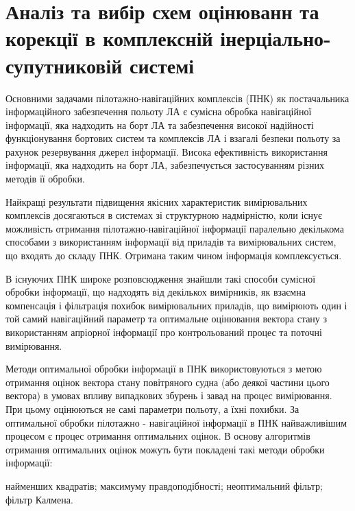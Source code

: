 \section{Аналіз та вибір схем оцінюванн та корекції в комплексній інерціально-супутниковій системі}

Основними задачами пілотажно-навігаційних комплексів (ПНК) як постачальника 
інформаційного забезпечення польоту ЛА є сумісна обробка навігаційної інформації, 
яка надходить на борт ЛА та забезпечення високої надійності функціонування бортових 
систем та комплексів ЛА і взагалі безпеки польоту за рахунок резервування 
джерел інформації. Висока ефективність використання інформації, яка 
надходить на борт ЛА, забезпечується застосуванням різних методів її обробки. 

Найкращі результати підвищення якісних характеристик вимірювальних комплексів 
досягаються  в системах зі структурною надмірністю, коли існує можливість 
отримання пілотажно-навігаційної інформації паралельно декількома способами з 
використанням інформації від приладів та вимірювальних систем, що входять до 
складу ПНК. Отримана таким чином інформація комплексується.

В існуючих ПНК широке розповсюдження знайшли такі способи сумісної обробки 
інформації, що надходять від декількох вимірників, як взаємна компенсація і 
фільтрація похибок вимірювальних приладів, що вимірюють один і той самий 
навігаційний параметр та оптимальне оцінювання вектора стану з використанням 
апріорної інформації про контрольований процес та поточні вимірювання.

Методи оптимальної обробки інформації в ПНК використовуються з метою 
отримання оцінок вектора стану повітряного судна (або деякої частини 
цього вектора) в умовах впливу випадкових збурень і завад на процес 
вимірювання. При цьому оцінюються не самі параметри польоту, а їхні похибки. 
За оптимальної обробки пілотажно - навігаційної інформації в ПНК найважливішим 
процесом є процес отримання оптимальних оцінок. В основу алгоритмів отримання 
оптимальних оцінок можуть бути покладені такі методи обробки інформації:
\begin{itemize}
   найменших квадратів;
  максимуму правдоподібності;
  неоптимальний фільтр;
  фільтр Калмена.
\end{itemize}


